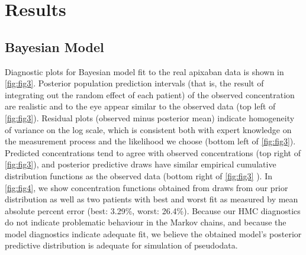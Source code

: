 \section{Results}
\subsection*{Bayesian Model}

Diagnostic plots for Bayesian model fit to the real apixaban data is shown in \cref{fig:fig3}.  Posterior population prediction intervals (that is, the result of integrating out the random effect of each patient) of the observed concentration are realistic and to the eye appear similar to the observed data (top left of \cref{fig:fig3}).  Residual plots (observed minus posterior mean) indicate homogeneity of variance on the log scale, which is consistent both with expert knowledge on the measurement process and the likelihood we choose (bottom left of \cref{fig:fig3}). Predicted concentrations tend to agree with observed concentrations (top right of \cref{fig:fig3}), and posterior predictive draws have similar empirical cumulative distribution functions as the observed data (bottom right of \cref{fig:fig3} ). In \cref{fig:fig4}, we show concentration functions obtained from draws from our prior distribution as well as two patients with best and worst fit as measured by mean absolute percent error (best: 3.29\%, worst: 26.4\%). Because our HMC diagnostics do not indicate problematic behaviour in the Markov chains, and because the model diagnostics indicate adequate fit, we believe the obtained model’s posterior predictive distribution is adequate for simulation of pseudodata.


